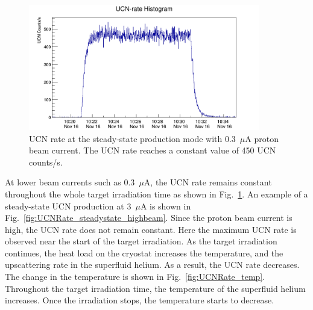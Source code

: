 \begin{figure}[h!]
  \centering
  \includegraphics[width=0.9\textwidth]{steadystate_point3muA.png}
  \caption[Steady-state UCN rate at 0.3~$\mu$A beam current]{UCN rate at the
    steady-state production mode with 0.3~$\mu$A proton beam
    current. The UCN rate reaches a constant value of 450 UCN
    counts/s.}
  \label{fig:UCNRate_steadystate}
\end{figure}

At lower beam currents such as 0.3~$\mu$A, the UCN rate remains
constant throughout the whole target irradiation time as shown in
Fig.~\ref{fig:UCNRate_steadystate}. An example of a steady-state UCN
production at 3~$\mu$A is shown in
Fig.~\ref{fig:UCNRate_steadystate_highbeam}. Since the proton beam
current is high, the UCN rate does not remain constant. Here the
maximum UCN rate is observed near the start of the target
irradiation. As the target irradiation continues, the heat load on the
cryostat increases the temperature, and the upscattering rate in the
superfluid helium. As a result, the UCN rate decreases. The change in
the temperature is shown in Fig.~\ref{fig:UCNRate_temp}. Throughout
the target irradiation time, the temperature of the superfluid helium
increases. Once the irradiation stops, the temperature starts to
decrease.


